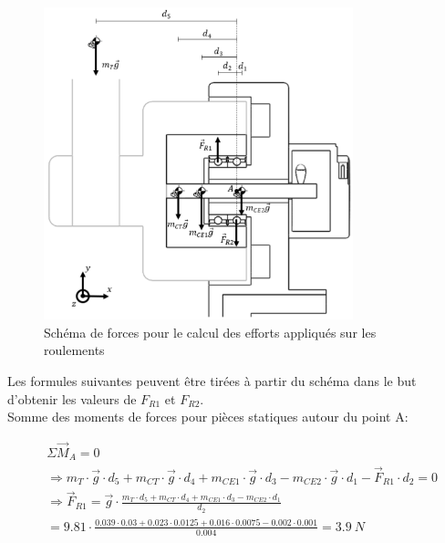 \begin{figure}[H]
  \centering
  \includegraphics[width = 0.8\textwidth]{assets/figures/CalculRoulements.svg}
  \caption{Schéma de forces pour le calcul des efforts appliqués sur les roulements}
  \label{fig:CalcRoul}
\end{figure}

Les formules suivantes peuvent être tirées à partir du schéma dans le but d'obtenir les valeurs de $F_{R1}$ et $F_{R2}$.\\
Somme des moments de forces pour pièces statiques autour du point A:

\begin{equation}
  \begin{aligned}
     & \Sigma \vec{M}_A = 0                                                                                                                                                       \\
     & \Rightarrow  m_T \cdot \vec{g} \cdot d_5 + m_{CT} \cdot \vec{g} \cdot d_4 + m_{CE1} \cdot \vec{g} \cdot d_3 - m_{CE2} \cdot \vec{g} \cdot d_1 - \vec{F}_{R1} \cdot d_2 = 0 \\
     & \Rightarrow  \vec{F}_{R1} = \vec{g} \cdot \frac{m_T \cdot d_5 + m_{CT} \cdot d_4 + m_{CE1} \cdot d_3 - m_{CE2} \cdot d_1}{d_2}                                             \\
     & = 9.81 \cdot \frac{0.039 \cdot 0.03 + 0.023 \cdot 0.0125 + 0.016 \cdot 0.0075 - 0.002 \cdot 0.001}{0.004} = 3.9~N
  \end{aligned}
\end{equation}

